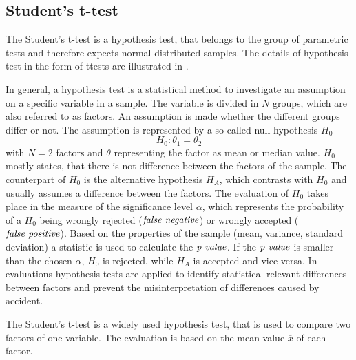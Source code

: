 \subsection{Student's t-test}\label{ord:ch2:sec4:subsec2}

The Student's t-test is a hypothesis test, that belongs to the group of parametric tests and therefore expects normal distributed samples.
The details of hypothesis test in the form of ttests are illustrated in \cite{Dodge08-Statistics} \cite{FisherBox81-StudentT} \cite{RK06-HypothesisTesting}.

In general, a hypothesis test is a statistical method to investigate an assumption on a specific variable in a sample.
The variable is divided in $N$ groups, which are also referred to as factors.
An assumption is made whether the different groups differ or not.
The assumption is represented by a so-called null hypothesis $H_{0}$
\begin{equation}
	H_{0}: \theta_{1} = \theta_{2}
\end{equation}
with $N=2$ factors and $\theta$ representing the factor as \eg mean or median value.
$H_{0}$ mostly states, that there is not difference between the factors of the sample.
The counterpart of $H_{0}$ is the alternative hypothesis $H_{A}$,
which contrasts with $H_{0}$ and usually assumes a difference between the factors.
The evaluation of $H_{0}$ takes place in the measure of the significance level $\alpha$, which represents the probability of a $H_{0}$ being wrongly rejected ($\textnormal{\textit{false negative}}$) or wrongly accepted ($\textnormal{\textit{false positive}}$).
Based on the properties of the sample (\eg mean, variance, standard deviation) a statistic is used to calculate the $\textnormal{\textit{p-value}}$.
If the $\textnormal{\textit{p-value}}$ is smaller than the chosen $\alpha$, $H_{0}$ is rejected, while $H_{A}$ is accepted and vice versa.
In evaluations hypothesis tests are applied to identify statistical relevant differences between factors and prevent the misinterpretation of differences caused by accident.

The Student's t-test is a widely used hypothesis test, that is used to compare two factors of one variable.
The evaluation is based on the mean value $\overline{x}$ of each factor.


